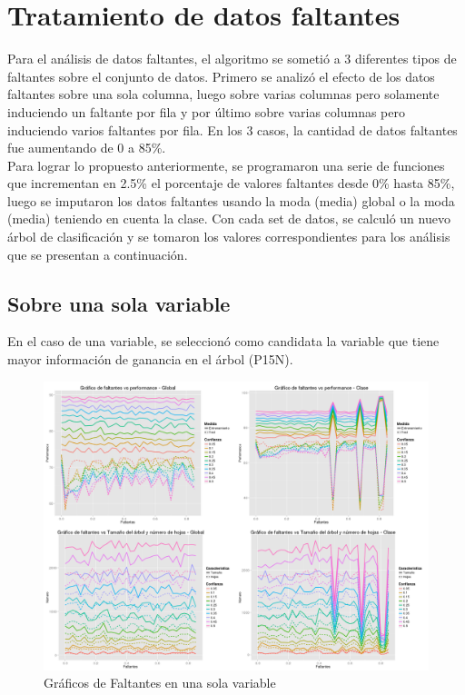 \documentclass[]{article}
\begin{document}
\section{Tratamiento de datos faltantes}
Para el análisis de datos faltantes, el algoritmo se sometió a 3 diferentes tipos de faltantes sobre el conjunto de datos. Primero se analizó el efecto de los datos faltantes sobre una sola columna, luego sobre varias columnas pero solamente induciendo un faltante por fila y por último sobre varias columnas pero induciendo varios faltantes por fila. En los 3 casos, la cantidad de datos faltantes fue aumentando de 0 a 85\%.\\
Para lograr lo propuesto anteriormente, se programaron una serie de funciones que incrementan en 2.5\% el porcentaje de valores faltantes desde 0\% hasta 85\%, luego se imputaron los datos faltantes usando la moda (media) global o la moda (media) teniendo en cuenta la clase. Con cada set de datos, se calculó un nuevo árbol de clasificación y se tomaron los valores correspondientes para los análisis que se presentan a continuación.

\subsection{Sobre una sola variable}
En el caso de una variable, se seleccionó como candidata la variable que tiene mayor información de ganancia en el árbol (P15N).

\begin{figure}[H]
	\includegraphics[scale = 0.27]{2_1_Unic_Col}
	\caption[Faltantes Unica variable]{Gráficos de Faltantes en una sola variable}
	\label{2.P2Unic_Var}
\end{figure}
\end{document}
